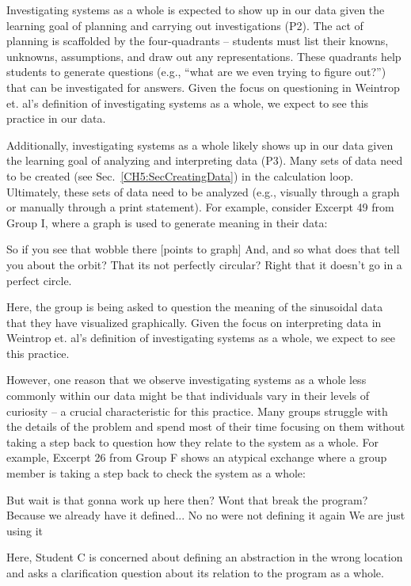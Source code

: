 \documentclass{msuphddissertation}
\begin{document}
\begin{doublespace}
\begin{appendices}
Investigating systems as a whole is expected to show up in our data given the learning goal of planning and carrying out investigations (P2).  The act of planning is scaffolded by the four-quadrants -- students must list their knowns, unknowns, assumptions, and draw out any representations.  These quadrants help students to generate questions (e.g., ``what are we even trying to figure out?'') that can be investigated for answers.  Given the focus on questioning in Weintrop et. al's definition of investigating systems as a whole, we expect to see this practice in our data.

Additionally, investigating systems as a whole likely shows up in our data given the learning goal of analyzing and interpreting data (P3).  Many sets of data need to be created (see Sec.~\ref{CH5:SecCreatingData}) in the calculation loop.  Ultimately, these sets of data need to be analyzed (e.g., visually through a graph or manually through a print statement).  For example, consider Excerpt 49 from Group I, where a graph is used to generate meaning in their data:  \begin{description}
\TA So if you see that wobble there [points to graph]
\TA And, and so what does that tell you about the orbit?
\SB That its not perfectly circular?
\SC Right that it doesn't go in a perfect circle.
\end{description}  Here, the group is being asked to question the meaning of the sinusoidal data that they have visualized graphically.  Given the focus on interpreting data in Weintrop et. al's definition of investigating systems as a whole, we expect to see this practice.

However, one reason that we observe investigating systems as a whole less commonly within our data might be that individuals vary in their levels of curiosity -- a crucial characteristic for this practice.  Many groups struggle with the details of the problem and spend most of their time focusing on them without taking a step back to question how they relate to the system as a whole.  For example, Excerpt 26 from Group F shows an atypical exchange where a group member is taking a step back to check the system as a whole: \begin{description}
\SC But wait is that gonna work up here then?
\SC Wont that break the program?
\SC Because we already have it defined...
\SB No no were not defining it again
\SB We are just using it
\end{description}  Here, Student C is concerned about defining an abstraction in the wrong location and asks a clarification question about its relation to the program as a whole.


\end{appendices}
\end{doublespace}
\end{document}
